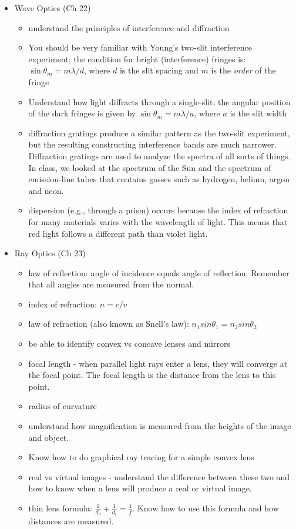 \begin{itemize}
\item Wave Optics (Ch 22)
\begin{itemize}
\item understand the principles of interference and diffraction
\item You should be very familiar with Young's two-slit interference experiment; the condition for
  bright (interference) fringes is: $\sin \theta_{m} = m \lambda/d$,
  where $d$ is the slit spacing and $m$ is the \emph{order} of the
  fringe 
\item Understand how light diffracts through a single-slit; the angular position of the dark
  fringes is given by $\sin \theta_{m} = m \lambda/ a$, where $a$ is
  the slit width
\item diffraction gratings produce a similar pattern as the two-slit
  experiment, but the resulting constructing interference bands are
  much narrower.  Diffraction gratings are used to analyze the spectra
  of all sorts of things.  In class, we looked at the spectrum of the
  Sun and the spectrum of emission-line tubes that contains gasses
  such as hydrogen, helium, argon and neon.
\item dispersion (e.g., through a prism) occurs because the index of
  refraction for many materials varies with the wavelength of light.
  This means that red light follows a different path than violet light.
\end{itemize}


\item Ray Optics (Ch 23)
\begin{itemize}
\item law of reflection: angle of incidence equals angle of
  reflection.  Remember that all angles are measured from the normal.
\item index of refraction: $n = c/v$
\item law of refraction (also known as Snell's law): $n_1 sin \theta_1 = n_2 sin \theta_2$
\item be able to identify convex vs concave lenses and mirrors
\item focal length - when parallel light rays enter a lens, they will
  converge at the focal point.  The focal length is the distance from
  the lens to this point.
\item radius of curvature
\item understand how magnification is measured from the heights of the
  image and object.
\item Know how to do graphical ray tracing for a simple convex lens
\item real vs virtual images - understand the difference between these
  two and how to know when a lens will produce a real or virtual image.
\item thin lens formula: $\frac{1}{d_o} + \frac{1}{d_i} =
  \frac{1}{f}$.  Know how to use this formula and how distances are
  measured.  
\end{itemize}


\end{itemize}
